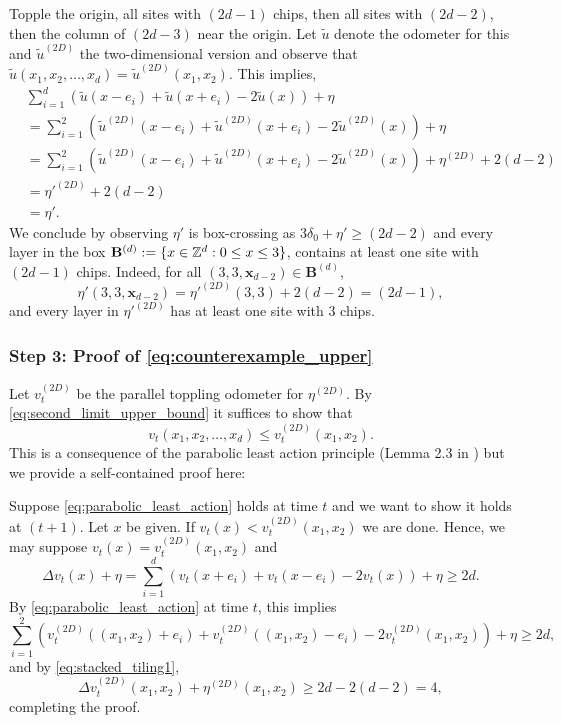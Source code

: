 \documentclass[12pt]{amsart}
\begin{document}
Topple the origin, all sites with $(2d - 1)$ chips, then all sites with $(2d - 2)$, then the column of $(2 d-3)$ near the origin. Let $\tilde{u}$ denote the odometer for this and $\tilde{u}^{(2D)}$ the two-dimensional version and observe that $\tilde{u}(x_1, x_2, \ldots, x_d) = \tilde{u}^{(2D)}(x_1,x_2)$. This implies,
\begin{align*}
&\sum_{i=1}^{d} (\tilde{u}(x-e_i) + \tilde{u}(x+e_i) - 2 \tilde{u}(x)) + \eta \\
&= \sum_{i=1}^2 (\tilde{u}^{(2D)}(x-e_i) + \tilde{u}^{(2D)}(x+e_i) - 2 \tilde{u}^{(2D)}(x)) + \eta \\
&= \sum_{i=1}^2 (\tilde{u}^{(2D)}(x-e_i) + \tilde{u}^{(2D)}(x+e_i) - 2 \tilde{u}^{(2D)}(x)) + \eta^{(2D)} + 2  (d-2) \\
&= {\eta'}^{(2D)} + 2  (d-2) \\
&= \eta'. 
\end{align*}
We conclude by observing $\eta'$ is box-crossing as $3  \delta_0 + \eta' \geq (2 d - 2)$ and every layer in the box  $\mathbf{B}^{(d)} := \{ x \in \mathbb{Z}^d : 0 \leq x \leq 3 \}$, contains at least one site with $(2 d - 1)$ chips. Indeed, for all $(3, 3, \mathbf{x}_{d-2}) \in \mathbf{B}^{(d)}$, 
\[
\eta'(3,3, \mathbf{x}_{d-2}) = {\eta'}^{(2D)}(3, 3) + 2  (d - 2) = (2 d - 1),
\]
and every layer in ${\eta'}^{(2D)}$ has at least one site with 3 chips. 




\subsubsection*{Step 3: Proof of \eqref{eq:counterexample_upper}}
Let $v_t^{(2D)}$ be the parallel toppling odometer for $\eta^{(2D)}$. By \eqref{eq:second_limit_upper_bound}
it suffices to show that
\begin{equation} \label{eq:parabolic_least_action}
v_t(x_1, x_2, \ldots, x_d) \leq v_t^{(2D)}(x_1,x_2). 
\end{equation}
This is a consequence of the parabolic least action principle (Lemma 2.3 in \cite{bou2020dynamic}) but 
we provide a self-contained proof here:

Suppose \eqref{eq:parabolic_least_action} holds at time $t$ and we want to show it holds at $(t+1)$.
Let $x$ be given. If $v_t(x) < v_t^{(2D)}(x_1,x_2)$ we are done. Hence, we may suppose $v_t(x) = v_t^{(2D)}(x_1,x_2)$
and 
\[
\Delta v_t(x) + \eta = \sum_{i=1}^d (v_t(x + e_i) + v_t(x - e_i) - 2 v_t(x)) + \eta \geq 2 d.
\]
By \eqref{eq:parabolic_least_action} at time $t$, this implies 
\[
\sum_{i=1}^2 (v_t^{(2D)}((x_1,x_2) + e_i) + v_t^{(2D)}((x_1,x_2) - e_i) - 2 v_t^{(2D)}(x_1,x_2)) + \eta \geq 2 d,
\]
and by \eqref{eq:stacked_tiling1}, 
\[
\Delta v_t^{(2D)}(x_1,x_2) + \eta^{(2D)}(x_1,x_2) \geq 2 d - 2  (d - 2) = 4,
\]
completing the proof.
\end{document}
